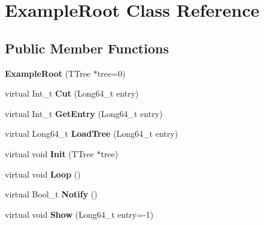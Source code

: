 \hypertarget{classExampleRoot}{\section{Example\-Root Class Reference}
\label{classExampleRoot}
}
\subsection*{Public Member Functions}
\begin{DoxyCompactItemize}
\item 
\hypertarget{classExampleRoot_a676a00459c76535ea0cc496333e0927f}{{\bfseries Example\-Root} (T\-Tree $\ast$tree=0)}\label{classExampleRoot_a676a00459c76535ea0cc496333e0927f}

\item 
\hypertarget{classExampleRoot_aba673d12c81ffc5dc397cb76ed9b8087}{virtual Int\-\_\-t {\bfseries Cut} (Long64\-\_\-t entry)}\label{classExampleRoot_aba673d12c81ffc5dc397cb76ed9b8087}

\item 
\hypertarget{classExampleRoot_a6c6c46e20aaa5028fa5bcb62309ba7ce}{virtual Int\-\_\-t {\bfseries Get\-Entry} (Long64\-\_\-t entry)}\label{classExampleRoot_a6c6c46e20aaa5028fa5bcb62309ba7ce}

\item 
\hypertarget{classExampleRoot_aa9bbc6aff6990a2b4693706ce07edde5}{virtual Long64\-\_\-t {\bfseries Load\-Tree} (Long64\-\_\-t entry)}\label{classExampleRoot_aa9bbc6aff6990a2b4693706ce07edde5}

\item 
\hypertarget{classExampleRoot_add4bdba90c035826e89968241d02f7dc}{virtual void {\bfseries Init} (T\-Tree $\ast$tree)}\label{classExampleRoot_add4bdba90c035826e89968241d02f7dc}

\item 
\hypertarget{classExampleRoot_ac2cd7b771c6f1094df4278c2c81fa5d4}{virtual void {\bfseries Loop} ()}\label{classExampleRoot_ac2cd7b771c6f1094df4278c2c81fa5d4}

\item 
\hypertarget{classExampleRoot_aac45c464636824a5456ef7e043f7eb73}{virtual Bool\-\_\-t {\bfseries Notify} ()}\label{classExampleRoot_aac45c464636824a5456ef7e043f7eb73}

\item 
\hypertarget{classExampleRoot_ab64d8495a5646dcef0973579ebf40b49}{virtual void {\bfseries Show} (Long64\-\_\-t entry=-\/1)}\label{classExampleRoot_ab64d8495a5646dcef0973579ebf40b49}

\end{DoxyCompactItemize}
